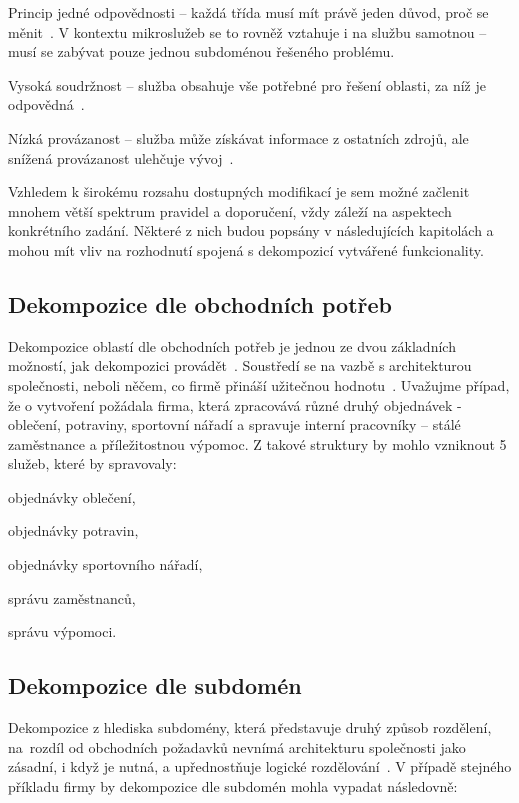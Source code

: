 \begin{dl}
   \item[Princip jedné odpovědnosti] – každá třída musí mít právě jeden důvod, proč se měnit~\cite{srp}.
   V kontextu mikroslužeb se to rovněž vztahuje i na službu samotnou – musí se zabývat pouze jednou subdoménou řešeného problému.
   \item[Vysoká soudržnost] – služba obsahuje vše potřebné pro řešení oblasti, za níž je odpovědná~\cite{lchc}.
   \item[Nízká provázanost] – služba může získávat informace z ostatních zdrojů, ale snížená provázanost ulehčuje vývoj~\cite{lchc}.
\end{dl}


Vzhledem k širokému rozsahu dostupných modifikací  je sem možné začlenit mnohem větší spektrum pravidel a doporučení, vždy záleží na aspektech konkrétního zadání.
Některé z nich budou popsány v následujících kapitolách a mohou mít vliv na rozhodnutí spojená s dekompozicí vytvářené funkcionality.



\subsection{Dekompozice dle obchodních potřeb}\label{subsec:msa-decomposition-business}
Dekompozice oblastí dle obchodních potřeb je jednou ze dvou základních možností, jak dekompozici provádět~\cite{msachris}.
Soustředí se na vazbě s architekturou společnosti, neboli něčem, co firmě přináší užitečnou hodnotu~\cite{decompbusiness}.
Uvažujme případ, že o vytvoření  požádala firma, která zpracovává různé druhý objednávek - oblečení, potraviny, sportovní nářadí a spravuje interní pracovníky – stálé zaměstnance a příležitostnou výpomoc.
Z takové struktury by mohlo vzniknout 5 služeb, které by spravovaly:


\begin{ul}
   \item objednávky oblečení,
   \item objednávky potravin,
   \item objednávky sportovního nářadí,
   \item správu zaměstnanců,
   \item správu výpomoci.
\end{ul}



\subsection{Dekompozice dle subdomén}\label{subsec:msa-decomposition-domain}
Dekompozice z hlediska subdomény, která představuje druhý způsob rozdělení, na~rozdíl od obchodních požadavků nevnímá architekturu společnosti jako zásadní, i když je nutná, a upřednostňuje logické rozdělování~\cite{decompsubdomain}.
V případě stejného příkladu firmy by dekompozice dle subdomén mohla vypadat následovně:


